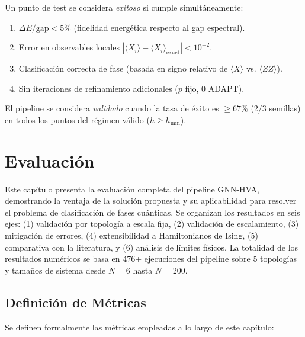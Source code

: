 \documentclass[11pt,a4paper,spanish]{book}
\begin{document}
Un punto de test se considera \emph{exitoso} si cumple simultáneamente:
\begin{enumerate}
    \item $\Delta E/\text{gap} < 5\%$ (fidelidad energética respecto al gap espectral).
    \item Error en observables locales $|\langle X_i \rangle - \langle X_i \rangle_{\text{exact}}| < 10^{-2}$.
    \item Clasificación correcta de fase (basada en signo relativo de $\langle X \rangle$ vs. $\langle ZZ \rangle$).
    \item Sin iteraciones de refinamiento adicionales ($p$ fijo, 0 ADAPT).
\end{enumerate}

El pipeline se considera \emph{validado} cuando la tasa de éxito es $\geq 67\%$ (2/3 semillas) en todos los puntos del régimen válido ($h \geq h_{\min}$).



\chapter{Evaluación}

Este capítulo presenta la evaluación completa del pipeline GNN-HVA, demostrando la ventaja de la solución propuesta y su aplicabilidad para resolver el problema de clasificación de fases cuánticas. Se organizan los resultados en seis ejes: (1) validación por topología a escala fija, (2) validación de escalamiento, (3) mitigación de errores, (4) extensibilidad a Hamiltonianos de Ising, (5) comparativa con la literatura, y (6) análisis de límites físicos. La totalidad de los resultados numéricos se basa en 476+ ejecuciones del pipeline sobre 5 topologías y tamaños de sistema desde $N = 6$ hasta $N = 200$.

\section{Definición de Métricas}

Se definen formalmente las métricas empleadas a lo largo de este capítulo:
\end{document}
